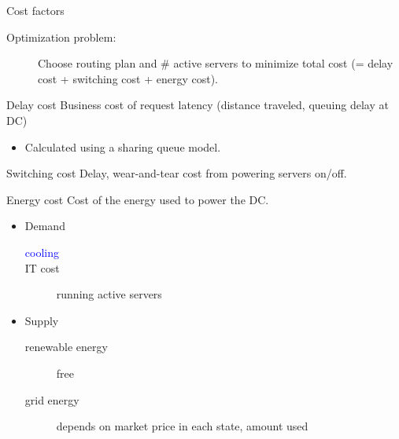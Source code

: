 \documentclass[xcolor=dvipsnames]{beamer}
\begin{document}
\begin{frame}{Cost factors}
	\begin{description}
		\item[Optimization problem:] Choose routing plan and \# active servers to minimize total cost (= delay cost + switching cost + energy cost).
	\end{description}
	\begin{block}{Delay cost}
		Business cost of request latency (distance traveled, queuing delay at DC)
		\begin{itemize} \item Calculated using a sharing queue model. \end{itemize}
	\end{block}
	\begin{block}{Switching cost}
		Delay, wear-and-tear cost from powering servers on/off. %
	\end{block}
	\begin{block}{Energy cost}
		Cost of the energy used to power the DC.
		\begin{itemize}
			\item Demand
			\begin{description}
				\item[\textcolor{blue}{cooling}]
				\item[IT cost] running active servers
			\end{description}
			\item Supply
			\begin{description}
				\item[renewable energy] free
				\item[grid energy] depends on market price in each state, amount used
			\end{description}
		\end{itemize}
	\end{block}
\end{frame}
\end{document}
